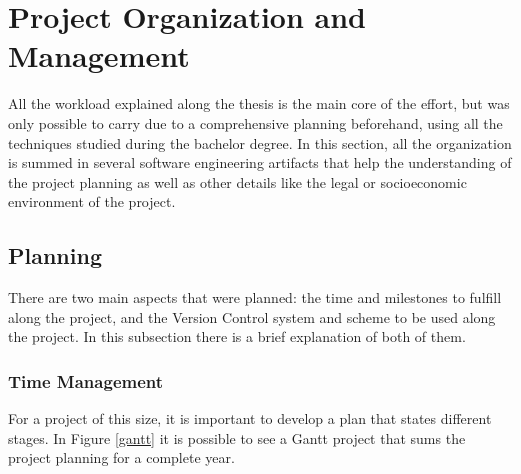\section{Project Organization and Management}

All the workload explained along the thesis is the main core of the effort, but
was only possible to carry due to a comprehensive planning beforehand, using
all the techniques studied during the bachelor degree. In this section, all the
organization is summed in several software engineering artifacts that help the
understanding of the project planning as well as other details like the legal
or socioeconomic environment of the project.\\

\subsection{Planning}

There are two main aspects that were planned: the time and milestones to
fulfill along the project, and the Version Control system and scheme to be used
along the project. In this subsection there is a brief explanation of both of
them.\\

\subsubsection{Time Management}

For a project of this size, it is important to develop a plan that states
different stages. In Figure \ref{gantt} it is possible to see a Gantt project
that sums the project planning for a complete year.\\

